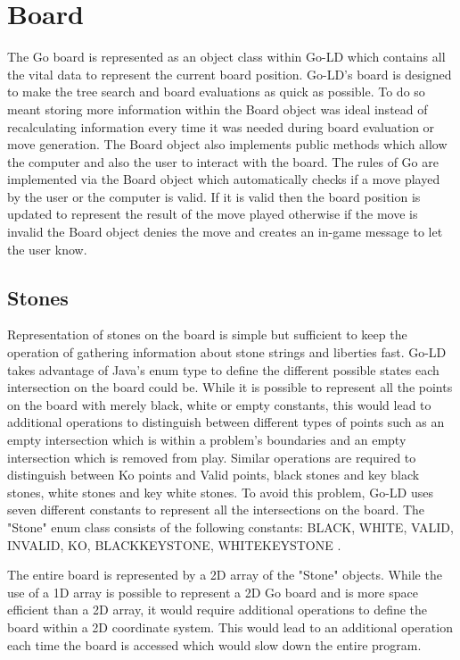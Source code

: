 \documentclass{l4proj}
\begin{document}
\section{Board}

The Go board is represented as an object class within Go-LD which contains all the vital data to represent the current board position. Go-LD's board is designed to make the tree search and board evaluations as quick as possible. To do so meant storing more information within the Board object was ideal instead of recalculating information every time it was needed during board evaluation or move generation. The Board object also implements public methods which allow the computer and also the user to interact with the board. The rules of Go are implemented via the Board object which automatically checks if a move played by the user or the computer is valid. If it is valid then the board position is updated to represent the result of the move played otherwise if the move is invalid the Board object denies the move and creates an in-game message to let the user know.

\subsection{Stones}
Representation of stones on the board is simple but sufficient to keep the operation of gathering information about stone strings and liberties fast. Go-LD takes advantage of Java’s enum type to define the different possible states each intersection on the board could be. While it is possible to represent all the points on the board with merely black, white or empty constants, this would lead to additional operations to distinguish between different types of points such as an empty intersection which is within a problem’s boundaries and an empty intersection which is removed from play. Similar operations are required to distinguish between Ko points and Valid points, black stones and key black stones, white stones and key white stones. To avoid this problem, Go-LD uses seven different constants to represent all the intersections on the board. The "Stone" enum class consists of the following constants: BLACK, WHITE, VALID, INVALID, KO, BLACKKEYSTONE, WHITEKEYSTONE .

The entire board is represented by a 2D array of the "Stone" objects. While the use of a 1D array is possible to represent a 2D Go board and is more space efficient than a 2D array, it would require additional operations to define the board within a 2D coordinate system. This would lead to an additional operation each time the board is accessed which would slow down the entire program.
\end{document}
